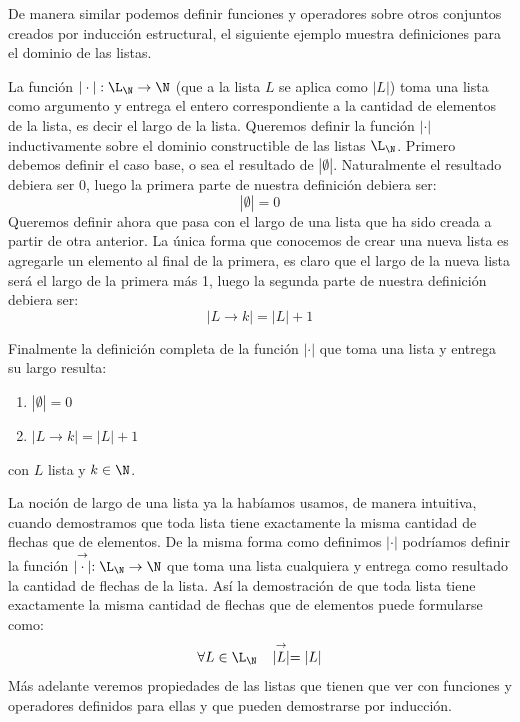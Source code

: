 De manera similar podemos definir funciones y operadores sobre otros conjuntos creados por inducción estructural, el siguiente ejemplo muestra definiciones para el dominio de las listas.

\begin{ejemplo}
La función $|\cdot|:\L_\N\rightarrow\N$ (que a la lista $L$ se aplica como $|L|$) toma una lista como argumento y entrega el entero correspondiente a la cantidad de elementos de la lista, es decir el largo de la lista.
Queremos definir la función $|\cdot|$ inductivamente sobre el dominio constructible de las listas $\L_\N$.
Primero debemos definir el caso base, o sea el resultado de $|\emptyset|$.
Naturalmente el resultado debiera ser $0$, luego la primera parte de nuestra definición debiera ser:
\[
|\emptyset| = 0
\]
Queremos definir ahora que pasa con el largo de una lista que ha sido creada a partir de otra anterior.
La única forma que conocemos de crear una nueva lista es agregarle un elemento al final de la primera, es claro que el largo de la nueva lista será el largo de la primera más 1, luego la segunda parte de nuestra definición debiera ser:
\[
|L\rightarrow k|=|L|+1
\]

Finalmente la definición completa de la función $|\cdot|$ que toma una lista y entrega su largo resulta:
\begin{enumerate}
\itemsep 0pt
\item $|\emptyset|=0$
\item $|L\rightarrow k|=|L|+1$
\end{enumerate}
con $L$ lista y $k\in\N$.
\end{ejemplo}

La noción de largo de una lista ya la habíamos usamos, de manera intuitiva, cuando demostramos que toda lista tiene exactamente la misma cantidad de flechas que de elementos.
De la misma forma como definimos $|\cdot|$ podríamos definir la función $\stackrel{\rightarrow}{|\cdot|}:\L_\N\rightarrow\N$ que toma una lista cualquiera y entrega como resultado la cantidad de flechas de la lista.
Así la demostración de que toda lista tiene exactamente la misma cantidad de flechas que de elementos puede formularse como:
\[
\forall L\in\L_\N\;\;\;\stackrel{\rightarrow}{|L|}=|L|
\]
Más adelante veremos propiedades de las listas que tienen que ver con funciones y operadores definidos para ellas y que pueden demostrarse por inducción.

